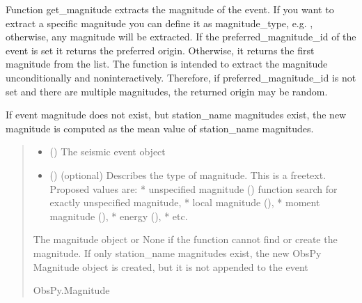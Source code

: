 \documentclass[letterpaper,10pt,english]{sphinxmanual}
\begin{document}
\begin{fulllineitems}
\label{\detokenize{api_core:core.utils.get_magnitude}}
\pysigstartsignatures
{}
\pysigstopsignatures
\sphinxAtStartPar
Function get\_magnitude extracts the magnitude of the event.
If you want to extract a specific magnitude you can define it as magnitude\_type,
e.g. , otherwise, any magnitude will be extracted.
If the preferred\_magnitude\_id of the event is set it returns the preferred origin.
Otherwise, it returns the first magnitude from the list.
The function is intended to extract the magnitude unconditionally and non\sphinxhyphen{}interactively.
Therefore, if preferred\_magnitude\_id is not set and there are multiple magnitudes,
the returned origin may be random.

\sphinxAtStartPar
If event magnitude does not exist, but station\_name magnitudes exist, the new magnitude is computed
as the mean value of station\_name magnitudes.
\begin{quote}\begin{description}
\begin{itemize}
\item {} 
\sphinxAtStartPar
{} () \textendash{} The seismic event object

\item {} 
\sphinxAtStartPar
{} () \textendash{} (optional)
Describes the type of magnitude. This is a free\sphinxhyphen{}text. Proposed values are:
* unspecified magnitude () \sphinxhyphen{} function search for exactly unspecified magnitude,
* local magnitude (),
* moment magnitude (),
* energy (),
* etc.

\end{itemize}

\sphinxAtStartPar
The magnitude object or None if the function cannot find or create the magnitude.
If only station\_name magnitudes exist, the new ObsPy Magnitude object is created,
but it is not appended to the event

\sphinxAtStartPar
ObsPy.Magnitude

\end{description}\end{quote}

\end{fulllineitems}
\end{document}
